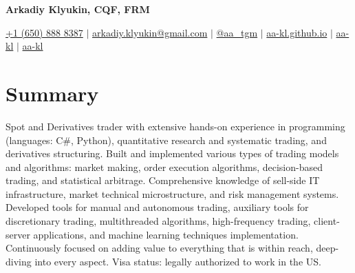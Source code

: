 \documentclass[a4paper,hidelinks]{article}
\begin{document}

\begin{center}
  \textbf{\Huge{Arkadiy Klyukin, CQF, FRM}} \\ \vspace{4pt}
  
  \small
  \faMobile* \hspace{.5pt} \href{tel:+16508888387}{+1 (650) 888 8387}
  $|$
  \faAt \hspace{.5pt} \href{mailto:arkadiy.klyukin@gmail.com}{arkadiy.klyukin@gmail.com}
  $|$
  \faTelegramPlane \hspace{.5pt} \href{https://t.me/aa_tgm}{@aa\_tgm}
  $|$
  \faGlobeAmericas \hspace{.5pt} \href{https://aa-kl.github.io}{aa-kl.github.io}
  $|$
  \faLinkedinIn \hspace{.5pt} \href{https://www.linkedin.com/in/aa-kl}{aa-kl}
  $|$
  \faGithub \hspace{.5pt} \href{https://github.com/aa-kl}{aa-kl}
\end{center}

\vspace{-12pt}
\section{Summary}
Spot and Derivatives trader with extensive hands-on experience in programming (languages: C\#, Python), quantitative research and systematic trading, and derivatives structuring. Built and implemented various types of trading models and algorithms: market making, order execution algorithms, decision-based trading, and statistical arbitrage. Comprehensive knowledge of sell-side IT infrastructure, market technical microstructure, and risk management systems. Developed tools for manual and autonomous trading, auxiliary tools for discretionary trading, multithreaded algorithms, high-frequency trading, client-server applications, and machine learning techniques implementation. Continuously focused on adding value to everything that is within reach, deep-diving into every aspect. Visa status: legally authorized to work in the US.\\
\end{document}
